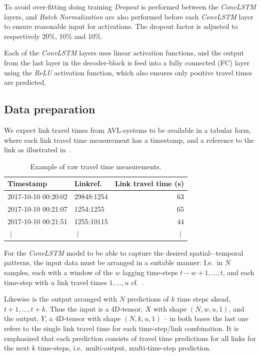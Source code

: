 \documentclass[preprint,11pt,5p,twocolumn]{elsarticle}
\begin{document}
To avoid over-fitting doing training \emph{Dropout} \cite{Dropout} is performed between the \emph{ConvLSTM} layers, and \emph{Batch Normalization} \cite{BatchNorm} are also performed before each \emph{ConvLSTM} layer to ensure reasonable input for activations. The dropout factor is adjusted to respectively 20\%, 10\% and 10\%.

Each of the \emph{ConvLSTM} layers uses linear activation functions, and the output from the last layer in the decoder-block is feed into a fully connected (FC) layer using the \emph{ReLU} activation function, which also ensures only positive travel times are predicted.

\subsection{Data preparation}
We expect link travel times from AVL-systems to be available in a tabular form, where each link travel time measurement has a timestamp, and a reference to the link as illustrated in~.
\begin{table}[!ht]
  \centering
  \footnotesize
  \begin{tabular}{llr}
    Timestamp & Linkref. & Link travel time (s) \\ \hline \hline
    2017-10-10 00:20:02 & 29848:1254 & 63 \\ \hline
    2017-10-10 00:21:07 & 1254:1255  & 65 \\ \hline
    2017-10-10 00:21:51 & 1255:10115 & 44 \\ \hline
    \vdots & \vdots & \vdots 
  \end{tabular}
  \caption{Example of raw travel time measurements.}
  \label{tab:data}
\end{table}

For the \emph{ConvLSTM} model to be able to capture the desired spatial-–temporal patterns, the input data must be arranged in a suitable manner: I.e.\ in $N$ samples, each with a window of the $w$ lagging time-steps $t-w+1, \ldots, t$, and each time-step with $u$ link travel times $1, \ldots, u$ cf.~.

Likewise is the output arranged with $N$ predictions of $k$ time steps ahead, $t+1, \ldots, t+k$. Thus the input is a 4D-tensor, $X$ with shape $(N, w, u, 1)$, and the output, $Y$, a 4D-tensor with shape $(N, k, u, 1)$ -- in both bases the last one refers to the single link travel time for each time-step/link combination. It is emphasized that each prediction consists of travel time predictions for all links for the next $k$ time-steps, i.e.\ multi-output, multi-time-step prediction.
\end{document}
